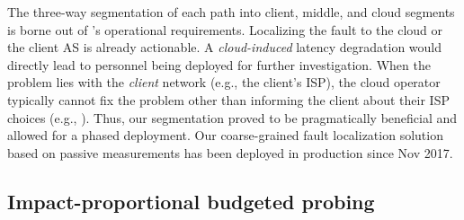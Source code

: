  The three-way segmentation of each path into client, middle, and cloud segments is borne out of {\azure}'s operational requirements. Localizing the fault to the cloud or the client AS is already actionable. A {\em cloud-induced} latency degradation would directly lead to personnel being deployed for further investigation. When the problem lies with the {\em client} network (e.g., the client's ISP), the cloud operator typically cannot fix the problem other than informing the client about their ISP choices (e.g., \cite{youtube-interruptions}). Thus, our segmentation proved to be pragmatically beneficial and allowed for a phased deployment. Our coarse-grained fault localization solution based on passive measurements has been deployed in production since Nov 2017.  %



\subsection{Impact-proportional budgeted probing}
\label{subsec:impact-proportional}

